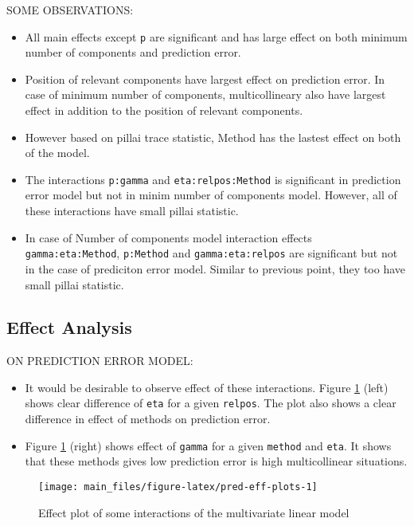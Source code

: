 \documentclass[12pt,3p,authoryear]{elsarticle}
\providecommand{\tightlist}{%
  \setlength{\itemsep}{0pt}\setlength{\parskip}{0pt}}
\begin{document}
SOME OBSERVATIONS:

\begin{itemize}
\tightlist
\item
  All main effects except \texttt{p} are significant and has large
  effect on both minimum number of components and prediction error.
\item
  Position of relevant components have largest effect on prediction
  error. In case of minimum number of components, multicollineary also
  have largest effect in addition to the position of relevant
  components.
\item
  However based on pillai trace statistic, Method has the lastest effect
  on both of the model.
\item
  The interactions \texttt{p:gamma} and \texttt{eta:relpos:Method} is
  significant in prediction error model but not in minim number of
  components model. However, all of these interactions have small pillai
  statistic.
\item
  In case of Number of components model interaction effects
  \texttt{gamma:eta:Method}, \texttt{p:Method} and
  \texttt{gamma:eta:relpos} are significant but not in the case of
  prediciton error model. Similar to previous point, they too have small
  pillai statistic.
\end{itemize}

\hypertarget{effect-analysis}{%
\subsection{Effect Analysis}\label{effect-analysis}}

ON PREDICTION ERROR MODEL:

\begin{itemize}
\tightlist
\item
  It would be desirable to observe effect of these interactions. Figure
  \ref{fig:pred-eff-plots} (left) shows clear difference of \texttt{eta}
  for a given \texttt{relpos}. The plot also shows a clear difference in
  effect of methods on prediction error.
\item
  Figure \ref{fig:pred-eff-plots} (right) shows effect of \texttt{gamma}
  for a given \texttt{method} and \texttt{eta}. It shows that these
  methods gives low prediction error is high multicollinear situations.
\end{itemize}

\begin{figure}
\texttt{[image: main\_files/figure-latex/pred-eff-plots-1]} \caption{Effect plot of some interactions of the multivariate linear model}\label{fig:pred-eff-plots}
\end{figure}
\end{document}
